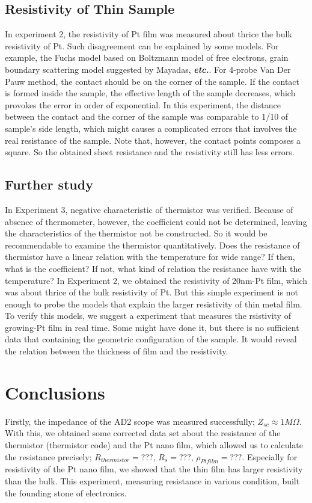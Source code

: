 \documentclass[5p,sort&compress]{elsarticle}
\begin{document}
\subsection{Resistivity of Thin Sample}
In experiment 2, the resistivity of Pt film was measured about thrice the bulk resistivity of Pt. Such disagreement can be explained by some models. For example, the Fuchs model based on Boltzmann model of free electrons, grain boundary scattering model suggested by Mayadas, \textbf{\textit{etc.}}. 
\newline
For 4-probe Van Der Pauw method, the contact should be on the corner of the sample. If the contact is formed inside the sample, the effective length of the sample decreases, which provokes the error in order of exponential. In this experiment, the distance between the contact and the corner of the sample was comparable to 1/10 of sample's side length, which might causes a complicated errors that involves the real resistance of the sample. Note that, however, the contact points composes a square. So the obtained sheet resistance and the resistivity still has less errors.

\subsection{Further study}
In Experiment 3, negative characteristic of thermistor was verified. Because of absence of thermometer, however, the coefficient could not be determined, leaving the characteristics of the thermistor not be constructed. So it would be recommendable to examine the thermistor quantitatively. Does the resistance of thermistor have a linear relation with the temperature for wide range? If then, what is the coefficient? If not, what kind of relation the resistance have with the temperature?
\newline
In Experiment 2, we obtained the resistivity of 20nm-Pt film, which was about thrice of the bulk resistivity of Pt. But this simple experiment is not enough to probe the models that explain the larger resistivity of thin metal film. To verify this models, we suggest a experiment that measures the rsistivity of growing-Pt film in real time. Some might have done it, but there is no sufficient data that containing the geometric configuration of the sample. It would reveal the relation between the thickness of film and the resistivity.

\section{Conclusions}
Firstly, the impedance of the AD2 scope was measured successfully; $Z_{sc} \approx 1M \Omega$. With this, we obtained some corrected data set about the resistance of the thermistor (thermistor code) and the Pt nano film, which allowed us to calculate the resistance precisely; $R_{thermistor} = ???$, $R_{s} = ???$, $\rho_{Pt film} = ???$. Especially for resistivity of the Pt nano film, we showed that the thin film has larger resistivity than the bulk. This experiment, measuring resistance in various condition, built the founding stone of electronics.
\end{document}
